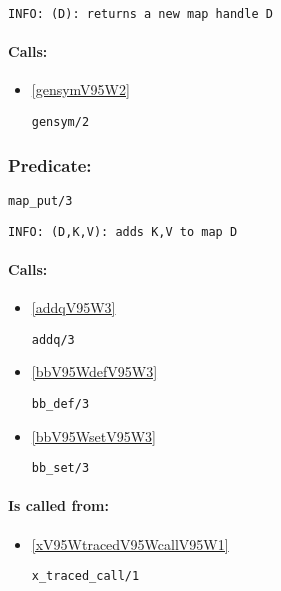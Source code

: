 {\small \begin{verbatim}
INFO: (D): returns a new map handle D

\end{verbatim}}
\paragraph{Calls:} 
\begin{itemize}
\item \ref{gensymV95W2} 
\begin{verbatim}
gensym/2
\end{verbatim}

\end{itemize}

\subsubsection{Predicate:} \label{mapV95WputV95W3}

\begin{verbatim}
map_put/3
\end{verbatim}

{\small \begin{verbatim}
INFO: (D,K,V): adds K,V to map D

\end{verbatim}}
\paragraph{Calls:} 
\begin{itemize}
\item \ref{addqV95W3} 
\begin{verbatim}
addq/3
\end{verbatim}

\item \ref{bbV95WdefV95W3} 
\begin{verbatim}
bb_def/3
\end{verbatim}

\item \ref{bbV95WsetV95W3} 
\begin{verbatim}
bb_set/3
\end{verbatim}

\end{itemize}
\paragraph{Is called from:} 
\begin{itemize}
\item \ref{xV95WtracedV95WcallV95W1} 
\begin{verbatim}
x_traced_call/1
\end{verbatim}

\end{itemize}


